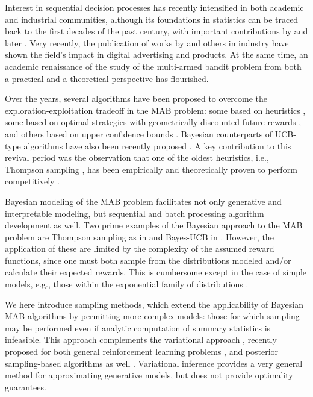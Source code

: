 \documentclass{article}
\newcommand{\ie}{i.e., }
\newcommand{\eg}{e.g., }
\begin{document}
Interest in sequential decision processes has recently intensified in both academic and industrial communities, although its foundations in statistics can be traced back to the first decades of the past century, with important contributions by \citet{j-Thompson1935} and later \citet{j-Robbins1952}. Very recently, the publication of works by \citet{ic-Chapelle2011} and others in industry have shown the field's impact in digital advertising and products. At the same time, an academic renaissance of the study of the multi-armed bandit problem from both a practical \cite{j-Li2010} and a theoretical \cite{j-Scott2010,j-Agrawal2011,ip-Maillard2011} perspective has flourished.

Over the years, several algorithms have been proposed to overcome the exploration-exploitation tradeoff in the MAB problem: some based on heuristics \citep{j-Auer2002}, some based on optimal strategies with geometrically discounted future rewards \citep{j-Gittins1979}, and others based on upper confidence bounds \citep{j-Lai1985,j-Lai1987}. Bayesian counterparts of UCB-type algorithms have also been recently proposed \citep{ip-Kaufmann2012}. A key contribution to this revival period was the observation that one of the oldest heuristics, \ie Thompson sampling \citep{j-Thompson1935,j-Thompson1933}, has been empirically and theoretically proven to perform competitively \cite{ic-Chapelle2011,j-Scott2015,j-Agrawal2012,j-Agrawal2012a,ic-Korda2013,j-Russo2014,j-Russo2016}.

Bayesian modeling of the MAB problem facilitates not only generative and interpretable modeling, but sequential and batch processing algorithm development as well. Two prime examples of the Bayesian approach to the MAB problem are Thompson sampling as in \cite{j-Scott2010} and Bayes-UCB in \cite{ip-Kaufmann2012}. However, the application of these are limited by the complexity of the assumed reward functions, since one must both sample from the distributions modeled and/or calculate their expected rewards. This is cumbersome except in the case of simple models, \eg those within the exponential family of distributions \cite{ic-Korda2013}.

We here introduce sampling methods, which extend the applicability of Bayesian MAB algorithms by permitting more complex models: those for which sampling may be performed even if analytic computation of summary statistics is infeasible. This approach complements the variational approach \cite{b-Bishop2006}, recently proposed for both general reinforcement learning problems \cite{ip-Blundell2015, j-Lipton2016}, and posterior sampling-based algorithms as well \cite{ip-Lamprier2017,ip-Urteaga2018}. Variational inference provides a very general method for approximating generative models, but does not provide optimality guarantees.
\end{document}
